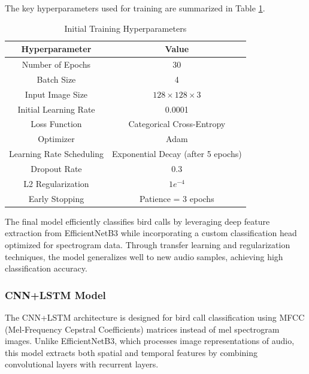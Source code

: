 \begin{itemize}
            The key hyperparameters used for training are summarized in Table \ref{tab:training_hyperparameters}.
            \begin{table}[h]
                  \centering
                  \caption{Initial Training Hyperparameters}
                  \label{tab:training_hyperparameters}
                  \begin{tabular}{|c|c|}
                  \hline
                  \textbf{Hyperparameter} & \textbf{Value} \\
                  \hline
                  Number of Epochs & 30 \\
                  \hline
                  Batch Size & 4 \\
                  \hline
                  Input Image Size & \(128 \times 128 \times 3\) \\
                  \hline
                  Initial Learning Rate & 0.0001 \\
                  \hline
                  Loss Function & Categorical Cross-Entropy \\
                  \hline
                  Optimizer & Adam \\
                  \hline
                  Learning Rate Scheduling & Exponential Decay (after 5 epochs) \\
                  \hline
                  Dropout Rate & 0.3 \\
                  \hline
                  L2 Regularization & \(1e^{-4}\) \\
                  Early Stopping & Patience = 3 epochs \\
                  \hline
                  \end{tabular}
            \end{table}
            
            
            The final model efficiently classifies bird calls by leveraging deep feature extraction from EfficientNetB3 while incorporating a custom classification head optimized for spectrogram data. Through transfer learning and regularization techniques, the model generalizes well to new audio samples, achieving high classification accuracy.
      \end{itemize}


      \subsubsection{CNN+LSTM Model}
      The CNN+LSTM architecture is designed for bird call classification using MFCC (Mel-Frequency Cepstral Coefficients) matrices instead of mel spectrogram images. Unlike EfficientNetB3, which processes image representations of audio, this model extracts both spatial and temporal features by combining convolutional layers with recurrent layers.

